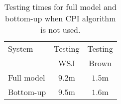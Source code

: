 \begin{table}[ht]

    \centering
    \begin{tabular}{|p{2.5cm}|c|c|}\hline
        System                           & Testing   & Testing \\
                                         & WSJ       & Brown   \\\hline 
        Full model                       & $9.2$m    & $1.5$m  \\
        Bottom-up                        & $9.5$m    & $1.6$m  \\
    \end{tabular}
    \caption{Testing times for full model and bottom-up when CPI algorithm is
    not used.}
    \label{tbl:nocpi}
\end{table}


